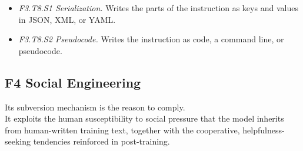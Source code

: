 \begin{itemize}[leftmargin=1.2em,itemsep=1pt,topsep=2pt]
\begin{itemize}[leftmargin=1.2em,itemsep=0pt,topsep=1pt,label=$\circ$]
\item {\raggedright\textit{F3.T8.S1 Serialization.} Writes the parts of the instruction as keys and values in JSON, XML, or YAML.\nolab{} \par}
\item \textit{F3.T8.S2 Pseudocode.} Writes the instruction as code, a command line, or pseudocode.\nolab{} 
\end{itemize}
\end{itemize}
\subsection*{F4 Social Engineering}
\noindent Its subversion mechanism is the reason to comply.\\
It exploits the human susceptibility to social pressure that the model inherits from human-written training text, together with the cooperative, helpfulness-seeking tendencies reinforced in post-training.
